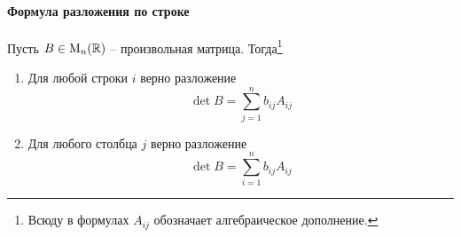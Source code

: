 \paragraph{Формула разложения по строке}

\begin{claim}\label{claim::DetExpand}
Пусть $B\in\operatorname{M}_{n}(\mathbb R)$ -- произвольная матрица. Тогда\footnote{Всюду в формулах $A_{ij}$ обозначает алгебраическое дополнение.}
\begin{enumerate}
\item Для любой строки $i$ верно разложение
\[
\det B = \sum_{j=1}^n b_{ij} A_{ij}
\]

\item Для любого столбца $j$ верно разложение
\[
\det B = \sum_{i=1}^n b_{ij} A_{ij}
\]
\end{enumerate}
\end{claim}
